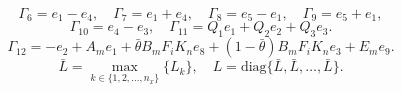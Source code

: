 \documentclass[preprint,review,fleqn,sort&compress,3p]{elsarticle}
\theoremstyle{definition} %
\theoremstyle{definition}%
\begin{document}
\begin{equation*}
	\Gamma_{6}=e_{1} - e_{4},\quad
	\Gamma_{7}=e_{1} + e_{4},\quad
	\Gamma_{8}=e_{5} - e_{1},\quad
	\Gamma_{9}=e_{5} + e_{1},
\end{equation*}
\begin{equation*}
	\Gamma_{10}=e_{4} - e_{3},
	\quad
	\Gamma_{11}=Q_1e_{1}+Q_2e_{2}+Q_3e_{3}.
\end{equation*}
\begin{equation*}
	\Gamma_{12}= 
	-e_{2} + A_me_{1} 
	+ \bar{\theta} B_{m} F_{i} K_{n} e_{8}
	+(1-\bar{\theta})B_{m} F_{i} K_{n} e_{3}
	+E_m e_{9}.
\end{equation*}
\begin{equation*}
	\bar{L}= \max_{k \in \{1,2,\ldots,n_x\}} \{L_k\},
	\quad
	L = \mathrm{diag}\{\bar{L}, \bar{L}, \dots, \bar{L}\}.
\end{equation*}
\end{document}
